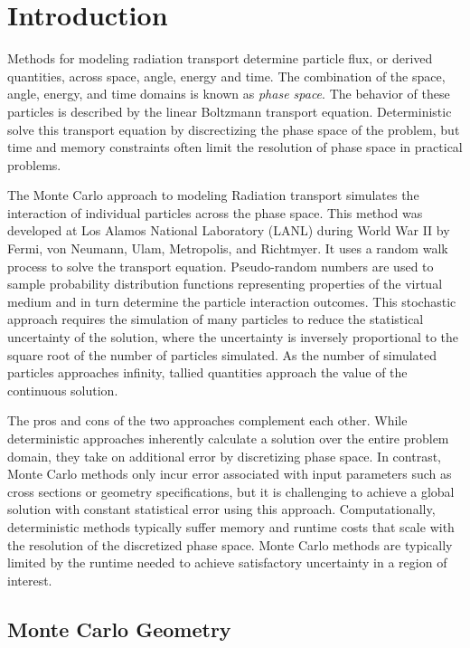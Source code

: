 
\chapter{Introduction}\label{ch:introduction}


Methods for modeling radiation transport determine particle flux, or derived
quantities, across space, angle, energy and time. The combination of the space,
angle, energy, and time domains is known as \textit{phase space}. The behavior
of these particles is described by the linear Boltzmann transport
equation\cite{Ulam_1949}. Deterministic solve this transport equation by discrectizing
the phase space of the problem, but time and memory constraints often limit the
resolution of phase space in practical problems.

The Monte Carlo approach to modeling Radiation transport simulates the
interaction of individual particles across the phase
space\cite{Lewis_1993}. This method was developed at Los Alamos National
Laboratory (LANL) during World War II by Fermi, von Neumann, Ulam, Metropolis,
and Richtmyer\cite{LANL_1987}. It uses a random walk process to solve the
transport equation. Pseudo-random numbers are used to sample probability
distribution functions representing properties of the virtual medium and in turn
determine the particle interaction outcomes. This stochastic approach requires
the simulation of many particles to reduce the statistical uncertainty of the
solution, where the uncertainty is inversely proportional to the square root of
the number of particles simulated. As the number of simulated particles
approaches infinity, tallied quantities approach the value of the continuous
solution.

The pros and cons of the two approaches complement each other. While
deterministic approaches inherently calculate a solution over the entire problem
domain, they take on additional error by discretizing phase space. In contrast,
Monte Carlo methods only incur error associated with input parameters such as
cross sections or geometry specifications, but it is challenging to achieve a
global solution with constant statistical error using this
approach. Computationally, deterministic methods typically suffer memory and
runtime costs that scale with the resolution of the discretized phase
space. Monte Carlo methods are typically limited by the runtime needed to
achieve satisfactory uncertainty in a region of interest.


\section{Monte Carlo Geometry}


